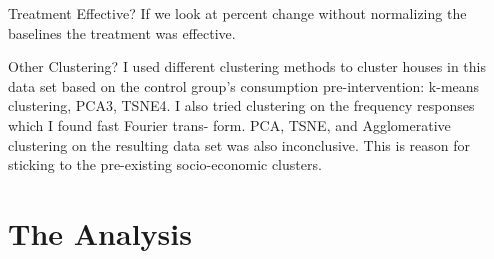 \documentclass{beamer}
\begin{document}
\begin{frame}{Treatment Effective?}
  If we look at percent change without normalizing the baselines the treatment was effective.
\end{frame}

\begin{frame}{Other Clustering?}
  I used different clustering methods to cluster houses in this data set based on the control group’s consumption pre-intervention: k-means clustering, PCA3, TSNE4. I also tried clustering on the frequency responses which I found fast Fourier trans- form. PCA, TSNE, and Agglomerative clustering on the resulting data set was also inconclusive. This is reason for sticking to the pre-existing socio-economic clusters.
\end{frame}


\section{The Analysis}
\end{document}
